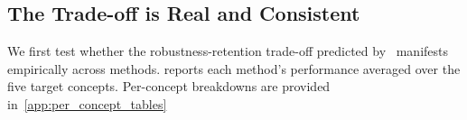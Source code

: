 


\subsection{The Trade-off is Real and Consistent}
\label{subsec:tradeoff_real}
We first test whether the robustness-retention trade-off predicted by~ manifests empirically across methods.  reports each method's performance averaged over the five target concepts.
Per-concept breakdowns are provided in~\cref{app:per_concept_tables} 
